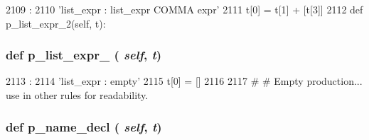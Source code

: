\begin{DoxyCode}
2109                               :
2110         'list_expr : list_expr COMMA expr'
2111         t[0] = t[1] + [t[3]]
2112 
    def p_list_expr_2(self, t):
\end{DoxyCode}
\hypertarget{classisa__parser_1_1ISAParser_a34bcb3b7558a6b333df6b1a897a9432e}{
\subsubsection[{p\_\-list\_\-expr\_\-2}]{\setlength{\rightskip}{0pt plus 5cm}def p\_\-list\_\-expr\_ ( {\em self}, \/   {\em t})}}
\label{classisa__parser_1_1ISAParser_a34bcb3b7558a6b333df6b1a897a9432e}



\begin{DoxyCode}
2113                               :
2114         'list_expr : empty'
2115         t[0] = []
2116 
2117     #
    # Empty production... use in other rules for readability.
\end{DoxyCode}
\hypertarget{classisa__parser_1_1ISAParser_a222c1fd8a739fac33949a4a1b8162324}{
\subsubsection[{p\_\-name\_\-decl}]{\setlength{\rightskip}{0pt plus 5cm}def p\_\-name\_\-decl ( {\em self}, \/   {\em t})}}
\label{classisa__parser_1_1ISAParser_a222c1fd8a739fac33949a4a1b8162324}



